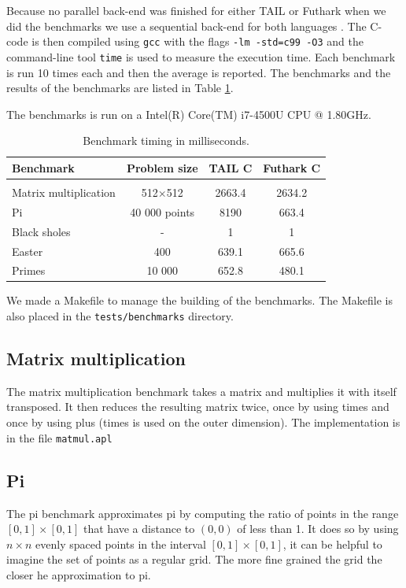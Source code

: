 \documentclass[11pt]{article}
\begin{document}
Because no parallel back-end was finished for either TAIL or Futhark when we did the benchmarks we use a sequential back-end for both languages \cite{ElsmanDybdal:Array:2014} \cite{TroelsHenriksen}. 
The C-code is then compiled using {\tt gcc} with the flags {\tt -lm -std=c99 -O3} and the command-line tool {\tt time} is used to measure the execution time. Each benchmark is run 10 times each and then the average is reported. The benchmarks and the results of the benchmarks are listed in Table \ref{tbl:benchmark}.

The benchmarks is run on a Intel(R) Core(TM) i7-4500U CPU @ 1.80GHz. 

\begin{table}[h]
\begin{center}
\begin{tabular}{l c c c}
Benchmark & Problem size & TAIL C & Futhark C \\ \hline \\
Matrix multiplication    & 512$\times$512    & 2663.4      & 2634.2  \\
Pi		     	         & 40 000 points     & 8190        & 663.4 \\
Black sholes             & - 			     & 1           & 1 \\
Easter                   & 400 		         & 639.1       & 665.6 \\
Primes                   & 10 000            & 652.8       & 480.1 \\
\end{tabular}
\caption{Benchmark timing in milliseconds.}
\label{tbl:benchmark}
\end{center}
\end{table}

We made a Makefile to manage the building of the benchmarks. The Makefile is also placed in the {\tt tests/benchmarks} directory.


\subsection{Matrix multiplication}
The matrix multiplication benchmark takes a matrix and multiplies it with itself transposed.
It then reduces the resulting matrix twice, once by using times and once by using plus (times is used on the outer dimension).
The implementation is in the file {\tt matmul.apl}

\subsection{Pi}
The pi benchmark approximates pi by computing the ratio of points in the range $[0,1] \times [0,1]$ that have a distance to $(0,0)$ of less than 1.
It does so by using $n \times n$ evenly spaced points in the interval $[0,1] \times [0,1]$, it can be helpful to imagine the set of points as a regular grid.
The more fine grained the grid the closer he approximation to pi.
\end{document}
